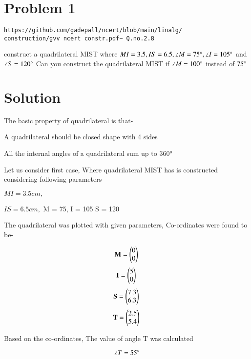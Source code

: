 \documentclass[journal,12pt,twocolumn]{IEEEtran}
\begin{document}
\section{Problem 1}
\begin{lstlisting}
https://github.com/gadepall/ncert/blob/main/linalg/
construction/gvv ncert constr.pdf− Q.no.2.8
\end{lstlisting}
construct a quadrilateral MIST where $MI = 3.5, IS = 6.5, \angle M = 75\degree , \angle I = 105\degree$ and $\angle S = 120\degree$
\newline
Can you construct the quadrilateral MIST if $\angle M = 100\degree $ instead of $75\degree$
\section{Solution}
The basic property of quadrilateral is that-

\begin{enumerate}
\begin{lemma}
     \item A quadrilateral should be closed shape with 4 sides
\end{lemma}
\begin{lemma}
     \item All the internal angles of a quadrilateral sum up to 360°
\end{lemma}
\end{enumerate}

Let us consider first case, Where quadrilateral MIST has is constructed considering following parameters

$MI = 3.5 cm,$ 

$IS = 6.5 cm,$
\angle M = 75\degree ,
\angle I = 105\degree
\angle S = 120\degree

The quadrilateral was plotted with given parameters,
Co-ordinates were found to be-

$$\mathbf {M} =\begin{pmatrix}0\\0\end{pmatrix}\\$$
$$\mathbf {I} =\begin{pmatrix}5\\0\end{pmatrix}\\$$
$$\mathbf {S} =\begin{pmatrix}7.3\\6.3\end{pmatrix}\\$$
$$\mathbf {T} =\begin{pmatrix}2.5\\5.4\end{pmatrix}\\$$


Based on the co-ordinates, The value of angle T was calculated

$$\angle T = 55\degree$$
\end{document}
